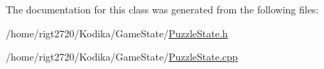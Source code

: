 The documentation for this class was generated from the following files\-:\begin{DoxyCompactItemize}
\item 
/home/rigt2720/\-Kodika/\-Game\-State/\hyperlink{PuzzleState_8h}{Puzzle\-State.\-h}\item 
/home/rigt2720/\-Kodika/\-Game\-State/\hyperlink{PuzzleState_8cpp}{Puzzle\-State.\-cpp}\end{DoxyCompactItemize}
